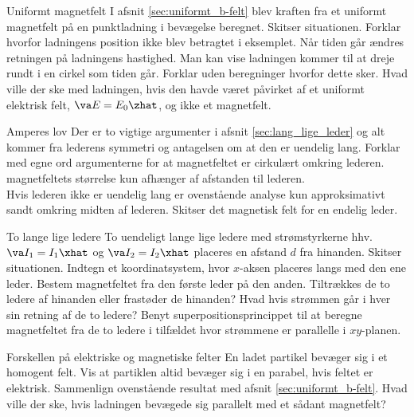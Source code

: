 \begin{opgave}{Uniformt magnetfelt}
    I afsnit \ref{sec:uniformt_b-felt} blev kraften fra et uniformt magnetfelt på en punktladning i bevægelse beregnet.
    \opg Skitser situationen.
    \opg Forklar hvorfor ladningens position ikke blev betragtet i eksemplet.
    \opg Når tiden går ændres retningen på ladningens hastighed. Man kan vise ladningen kommer til at dreje rundt i en cirkel som tiden går. Forklar uden beregninger hvorfor dette sker.
    \opg Hvad ville der ske med ladningen, hvis den havde været påvirket af et uniformt elektrisk felt, $\va E = E_0 \zhat$, og ikke et magnetfelt.
\end{opgave}

\begin{opgave}{Amperes lov}
    Der er to vigtige argumenter i afsnit \ref{sec:lang_lige_leder} og alt kommer fra lederens symmetri og antagelsen om at den er uendelig lang. Forklar med egne ord argumenterne for at
    \opg magnetfeltet er cirkulært omkring lederen.
    \opg magnetfeltets størrelse kun afhænger af afstanden til lederen. \\[4mm]
    Hvis lederen ikke er uendelig lang er ovenstående analyse kun approksimativt sandt omkring midten af lederen.
    \opg Skitser det magnetisk felt for en endelig leder.
\end{opgave}

\begin{opgave}{To lange lige ledere}
    To uendeligt lange lige ledere med strømstyrkerne hhv. $\va I_1 = I_1 \xhat$ og $\va I_2 = I_2 \xhat$ placeres en afstand $d$ fra hinanden.
    \opg Skitser situationen.
    \opg Indtegn et koordinatsystem, hvor $x$-aksen placeres langs med den ene leder.
    \opg Bestem magnetfeltet fra den første leder på den anden.
    \opg Tiltrækkes de to ledere af hinanden eller frastøder de hinanden?
    \opg Hvad hvis strømmen går i hver sin retning af de to ledere?
    \opg Benyt superpositionsprincippet til at beregne magnetfeltet fra de to ledere i tilfældet hvor strømmene er parallelle i $xy$-planen.
\end{opgave}

\begin{opgave}{Forskellen på elektriske og magnetiske felter}
    En ladet partikel bevæger sig i et homogent felt.
    \opg Vis at partiklen altid bevæger sig i en parabel, hvis feltet er elektrisk.
    \opg Sammenlign ovenstående resultat med afsnit \ref{sec:uniformt_b-felt}.
    \opg Hvad ville der ske, hvis ladningen bevægede sig parallelt med et sådant magnetfelt?
\end{opgave}

